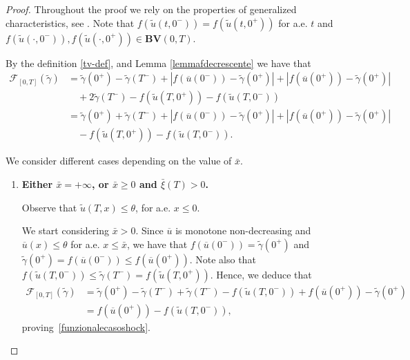 \documentclass[a4paper, 10pt, final]{article}
\begin{document}
  \begin{proof}

  
  Throughout the proof we rely on the properties of generalized characteristics, see \cite{d}. 
  Note that $f(\widetilde u(t, 0^-))= f(\widetilde u(t, 0^+))$ for a.e. $t$ and 
  $f(\widetilde u(\cdot, 0^-)),f(\widetilde u(\cdot, 0^+))\in \mathbf{BV}(0,T)$.
  
By the definition  \eqref{tv-def}, and Lemma \ref{lemmafdecrescente} we have that 
  \begin{align*}
    \mathcal F_{[0, T]}(\widetilde\gamma)
    & = 
     \widetilde \gamma(0^+)- \widetilde \gamma(T^-)
    +
    |f(\overline u(0^-))- \widetilde\gamma(0^+)| + |f(\overline u(0^+))- \widetilde \gamma(0^+)| 
    \\ 
    \nonumber 
    & \quad  +2 \widetilde\gamma(T^-)
    -f(\widetilde u(T,0^+))- f(\widetilde u(T,0^-))\\
     \nonumber 
    & = \widetilde \gamma(0^+)+\widetilde \gamma(T^-)+
    |f(\overline u(0^-))- \widetilde\gamma(0^+)| + |f(\overline u(0^+))- \widetilde \gamma(0^+)| 
    \\ 
    \nonumber 
    & \quad -f(\widetilde u(T,0^+))- f(\widetilde u(T,0^-)).
  \end{align*}
  
We consider different cases depending on the value of $\bar x$.  

  \begin{enumerate}
  \item  {\bf Either $\bar x=+\infty$, or $\bar x\geq  0$ and $\bar \xi(T)>0$.}

     Observe that 
    $\widetilde u(T,x)\leq \theta$, for a.e. $x\leq 0$. 

   We start considering $\bar x>0$. Since   $\overline u$ is monotone non-decreasing and $\overline u(x) \le \theta$ 
   for a.e. $x\leq \bar x$, we have that $f(\overline u(0^-))=\widetilde \gamma(0^+)$ and 
    $ \widetilde \gamma(0^+)=f(\overline u(0^-)) \le f(\overline u(0^+))$. 
    Note also that $f(\widetilde u(T,0^-))\leq \widetilde\gamma(T^-) = f(\widetilde u(T,0^+))$.
    Hence, we deduce that
    \begin{align*}
      \mathcal F_{[0, T]}(\widetilde\gamma)
      & = \widetilde\gamma(0^+)-\widetilde \gamma(T^-)
      + \widetilde\gamma(T^-)-f(\widetilde u(T,0^-))
      + f(\overline u(0^+))- \widetilde \gamma(0^+)
      \\
      & = f(\overline u(0^+))-f(\widetilde u(T,0^-)),
    \end{align*}
    proving~\eqref{funzionalecasoshock}.
  

\end{enumerate}
\end{proof}
\end{document}
